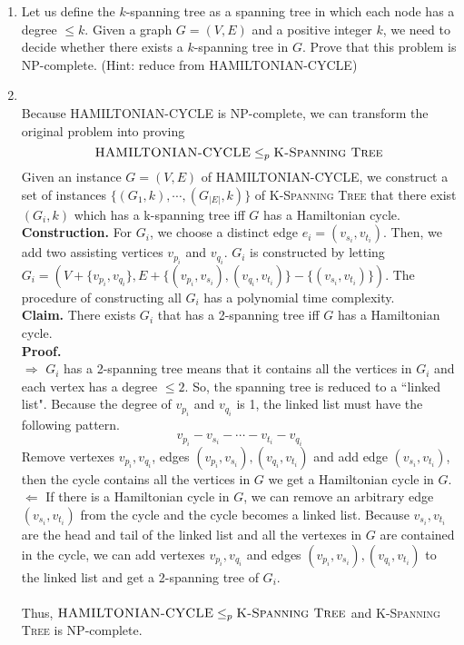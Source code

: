 \documentclass[12pt,a4paper]{article}
\makeatletter
\newtheorem*{solution}{Solution}
\theoremstyle{definition}
\renewenvironment{solution}[1][Solution] {\par\pushQED{\qed}\normalfont\topsep6\p@\@plus6\p@\relax\trivlist\item[\hskip\labelsep\bfseries#1\@addpunct{.}]\ignorespaces}{\popQED\endtrivlist\@endpefalse} \makeatother
\makeatother
\begin{document}
\begin{enumerate}
    \item Let us define the $k$-spanning tree as a spanning tree in which each node has a degree $\leqslant k$. Given a graph $G= (V,E)$ and a positive integer $k$, we need to decide whether there exists a $k$-spanning tree in $G$. Prove that this problem is NP-complete. (Hint: reduce from \textsc{HAMILTONIAN-CYCLE})
    \begin{solution}
    ~\\
    Because \textsc{HAMILTONIAN-CYCLE} is NP-complete, we can transform the original problem into proving 
    $$
    \textsc{HAMILTONIAN-CYCLE}\le_p\textsc{K-Spanning Tree}
    $$
    Given an instance $G=(V,E)$ of \textsc{HAMILTONIAN-CYCLE}, we construct a set of instances $\{(G_1,k),\cdots,(G_{|E|},k)\}$ of \textsc{K-Spanning Tree} that there exist $(G_i,k)$ which has a k-spanning tree iff $G$ has a Hamiltonian cycle.\\
    \textbf{Construction.} For $G_i$, we choose a distinct edge $e_i=(v_{s_i},v_{t_i})$. Then, we add two assisting vertices $v_{p_i}$ and $v_{q_i}$. $G_i$ is constructed by letting $G_i=(V+\{v_{p_i},v_{q_i}\},E+\{(v_{p_i},v_{s_i}),(v_{q_i},v_{t_i})\}-\{(v_{s_i},v_{t_i})\})$. The procedure of constructing all $G_i$ has a polynomial time complexity.\\
    \textbf{Claim.} There exists $G_i$ that has a 2-spanning tree iff $G$ has a Hamiltonian cycle. \\
    \textbf{Proof.}\\
    $\Longrightarrow$ $G_i$ has a 2-spanning tree means that it contains all the vertices in $G_i$ and each vertex has a degree $\le2$. So, the spanning tree is reduced to a ``linked list". Because the degree of $v_{p_i}$ and $v_{q_i}$ is 1, the linked list must have the following pattern.
    $$
    v_{p_i}-v_{s_i}-\cdots-v_{t_i}-v_{q_i}
    $$
    Remove vertexes $v_{p_i},v_{q_i}$, edges $(v_{p_i},v_{s_i}),(v_{q_i},v_{t_i})$ and add edge $(v_{s_i},v_{t_i})$, then the cycle contains all the vertices in $G$ we get a Hamiltonian cycle in $G$.\\
    $\Longleftarrow$ If there is a Hamiltonian cycle in $G$, we can remove an arbitrary edge $(v_{s_i},v_{t_i})$ from the cycle and the cycle becomes a linked list. Because $v_{s_i},v_{t_i}$ are the head and tail of the linked list and all the vertexes in $G$ are contained in the cycle, we can add vertexes $v_{p_i},v_{q_i}$ and edges $(v_{p_i},v_{s_i}),(v_{q_i},v_{t_i})$ to the linked list and get a 2-spanning tree of $G_i$.\\
    ~\\
    Thus, $\textsc{HAMILTONIAN-CYCLE}\le_p\textsc{K-Spanning Tree}$ and \textsc{K-Spanning Tree} is NP-complete.
    \end{solution}
    

\end{enumerate}
\end{document}
